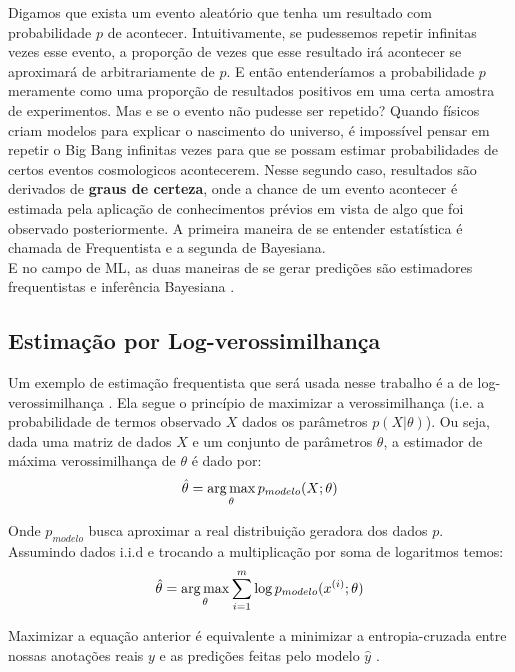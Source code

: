 Digamos que exista um evento aleatório que tenha um resultado com probabilidade $p$ de acontecer. Intuitivamente, se pudessemos repetir infinitas vezes esse evento, a proporção de vezes que esse resultado irá acontecer se aproximará de arbitrariamente de $p$. E então entenderíamos a probabilidade $p$ meramente como uma proporção de resultados positivos em uma certa amostra de experimentos. Mas e se o evento não pudesse ser repetido? Quando físicos criam modelos para explicar o nascimento do universo, é impossível pensar em repetir o Big Bang infinitas vezes para que se possam estimar probabilidades de certos eventos cosmologicos acontecerem. Nesse segundo caso, resultados são derivados de \textbf{graus de certeza}, onde a chance de um evento acontecer é estimada pela aplicação de conhecimentos prévios em vista de algo que foi observado posteriormente. A primeira maneira de se entender estatística é chamada de Frequentista e a segunda de Bayesiana. \\

E no campo de ML, as duas maneiras de se gerar predições são estimadores frequentistas e inferência Bayesiana \citep{dlbook}.

\subsection{Estimação por Log-verossimilhança}
 
Um exemplo de estimação frequentista que será usada nesse trabalho é a de
log-verossimilhança \citep{dlbook}. 
Ela segue o princípio de maximizar a verossimilhança (i.e. a probabilidade de
termos observado $X$ dados os parâmetros $p(X | \theta)$). Ou seja, dada uma matriz de dados $X$ e um conjunto de parâmetros $\theta$, a estimador de máxima verossimilhança de $\theta$ é dado por: \\

\[ \hat{\theta} = \operatorname*{arg\,max}_{\theta} p_{modelo}(X;\theta) \] 

Onde $p_{modelo}$ busca aproximar a real distribuição geradora dos dados $p$. Assumindo dados i.i.d e trocando a multiplicação por soma de logaritmos temos: \\

\[ \hat{\theta} = \operatorname*{arg\,max}_{\theta} \sum_{i=1}^{m} \log p_{modelo}(x^{(i)};\theta) \]

Maximizar a equação anterior é equivalente a minimizar a entropia-cruzada entre
nossas anotações reais $y$ e as predições feitas pelo modelo $\hat{y}$
\citep{dlbook}. \\

